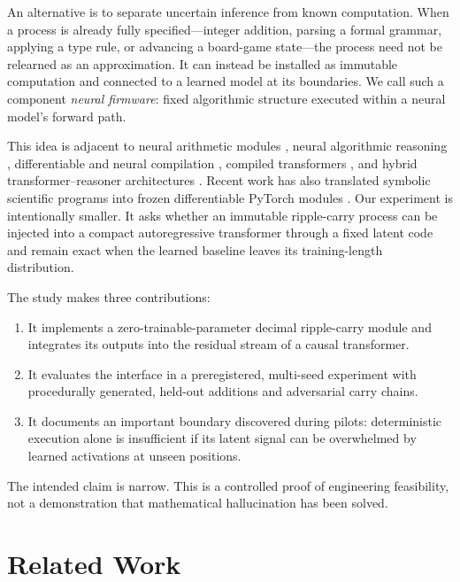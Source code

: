 \documentclass[11pt]{article}
\begin{document}
An alternative is to separate uncertain inference from known computation.
When a process is already fully specified---integer addition, parsing a formal
grammar, applying a type rule, or advancing a board-game state---the process
need not be relearned as an approximation. It can instead be installed as
immutable computation and connected to a learned model at its boundaries. We
call such a component \emph{neural firmware}: fixed algorithmic structure
executed within a neural model's forward path.

This idea is adjacent to neural arithmetic modules
\cite{trask2018neural}, neural algorithmic reasoning
\cite{velickovic2021neural}, differentiable and neural compilation
\cite{bunel2016adaptive,saldyt2024algorithmic}, compiled transformers
\cite{lindner2023tracr,shaw2024alta}, and hybrid transformer--reasoner
architectures \cite{bounsi2024transformers}. Recent work has also translated
symbolic scientific programs into frozen differentiable PyTorch modules
\cite{sheneman2026compiler}. Our experiment is intentionally smaller. It asks
whether an immutable ripple-carry process can be injected into a compact
autoregressive transformer through a fixed latent code and remain exact when
the learned baseline leaves its training-length distribution.

The study makes three contributions:

\begin{enumerate}
    \item It implements a zero-trainable-parameter decimal ripple-carry module
    and integrates its outputs into the residual stream of a causal
    transformer.
    \item It evaluates the interface in a preregistered, multi-seed experiment
    with procedurally generated, held-out additions and adversarial carry
    chains.
    \item It documents an important boundary discovered during pilots:
    deterministic execution alone is insufficient if its latent signal can be
    overwhelmed by learned activations at unseen positions.
\end{enumerate}

The intended claim is narrow. This is a controlled proof of engineering
feasibility, not a demonstration that mathematical hallucination has been
solved.

\section{Related Work}
\end{document}
